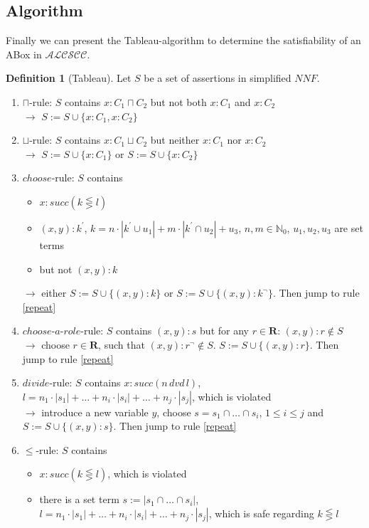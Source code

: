 \documentclass[a4paper,11pt]{scrartcl}
\theoremstyle{break}
\theoremstyle{definition}
\newtheorem{mydef}{Definition}
\begin{document}
\subsection{Algorithm}
Finally we can present the Tableau-algorithm to determine the satisfiability of an ABox in $\mathcal{ALCSCC}$.
\begin{mydef}[Tableau]
Let $S$ be a set of assertions in simplified $NNF$.
\begin{enumerate}
\item\label{cap} $\sqcap$-rule: $S$ contains $x:C_1\sqcap C_2$ but not both $x:C_1$ and $x:C_2$\\
$\rightarrow$ $S:=S\cup\{x:C_1, x:C_2\}$
\item\label{cup} $\sqcup$-rule: $S$ contains $x:C_1\sqcup C_2$ but neither $x:C_1$ nor $x:C_2$\\
$\rightarrow$ $S:=S\cup\{x:C_1\}$ or $S:=S\cup\{x:C_2\}$
\item\label{choose}$choose$-rule: $S$ contains
\begin{itemize}
\item $x:succ(k\lesseqgtr l)$
\item $(x,y):k^\prime$, $k=n\cdot|k^\prime\cup u_1|+m\cdot|k^\prime\cap u_2|+u_3$, $n,m\in\mathbb{N}_0$, $u_1,u_2,u_3$ are set terms
\item but not $(x,y):k$
\end{itemize}
$\rightarrow$ either $S:=S\cup\{(x,y):k\}$ or $S:=S\cup\{(x,y):k^\neg\}$. Then jump to rule \ref{repeat}
\item\label{chooserole}$choose$-$a$-$role$-rule: $S$ contains $(x,y):s$ but for any $r\in\mathbf{R}$: $(x,y):r\notin S$\\
$\rightarrow$ choose $r\in\mathbf{R}$, such that $(x,y):r^\neg\notin S$. $S:=S\cup\{(x,y):r\}$. Then jump to rule \ref{repeat}
\item\label{dvd}$divide$-rule: $S$ contains $x:succ(n\,dvd\,l)$, $l=n_1\cdot|s_1|+\dots+n_i\cdot|s_i|+\dots+n_j\cdot|s_j|$, which is violated\\
$\rightarrow$ introduce a new variable $y$, choose $s=s_1\cap \dots \cap s_i$, $1\leq i\leq j$ and $S:=S\cup\{(x,y):s\}$. Then jump to rule \ref{repeat}
\item\label{leq}$\leq$-rule: $S$ contains 
\begin{itemize}
\item $x:succ(k\lesseqgtr l)$, which is violated
\item there is a set term $s:=|s_1\cap \dots \cap s_i|$, $l=n_1\cdot|s_1|+\dots+n_i\cdot|s_i|+\dots+n_j\cdot|s_j|$, which is safe regarding $k\lesseqgtr l$

\end{itemize}
\end{enumerate}
\end{mydef}
\end{document}

